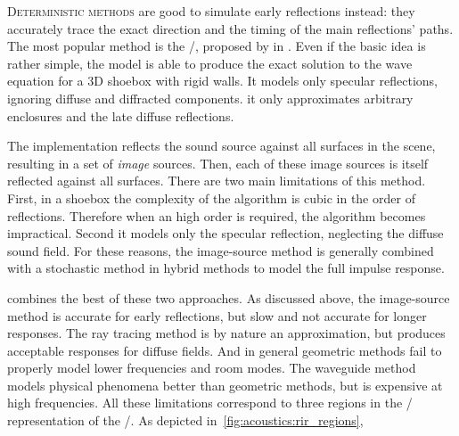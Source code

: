 \mynewline
\textsc{Deterministic methods} are good to simulate early reflections instead:
they accurately trace the exact direction and the timing of the main reflections' paths.
The most popular method is the \ISMdef/, proposed by \citeauthor{allen1979image} in .
Even if the basic idea is rather simple, the model is able to produce the exact solution to the wave equation for a 3D shoebox with rigid walls.
It models only specular reflections, ignoring diffuse and diffracted components.
it only approximates arbitrary enclosures and the late diffuse reflections.


\mynewline
The implementation reflects the sound source against all surfaces in the scene, resulting in a set of \textit{image} sources.
Then, each of these image sources is itself reflected against all surfaces.
There are two main limitations of this method.
First, in a shoebox the complexity of the algorithm is cubic in the order of reflections. Therefore when an high order is required, the algorithm becomes impractical.
Second it models only the specular reflection, neglecting the diffuse sound field.
For these reasons, the image-source method is generally combined with a stochastic method in hybrid methods to model the full impulse response.

 combines the best of these two approaches.
As discussed above, the image-source method is accurate for early reflections, but slow and not accurate for longer responses.
The ray tracing method is by nature an approximation, but produces acceptable responses for diffuse fields.
And in general geometric methods fail to properly model lower frequencies and room modes.
The waveguide method models physical phenomena better than geometric methods, but is expensive at high frequencies.
All these limitations correspond to three regions in the \TFdef/ representation of the \RIR/.
As depicted in~\cref{fig:acoustics:rir_regions},



